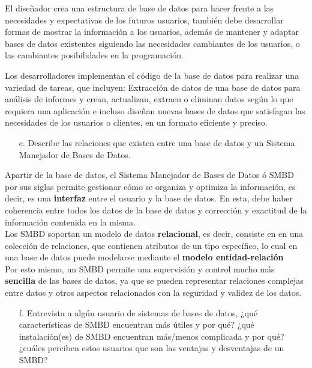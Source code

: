 \documentclass{article}
\begin{document}
\begin{enumerate}
    El diseñador crea una estructura de base de datos para hacer frente a las necesidades y expectativas de los futuros usuarios, también debe desarrollar formas de mostrar la información a los usuarios, además de mantener y adaptar bases de datos existentes siguiendo las necesidades cambiantes de los usuarios, o las cambiantes posibilidades en la programación. 

    Los desarrolladores implementan el código de la base de datos para realizar una variedad de tareas, que incluyen: Extracción de datos de una base de datos para análisis de informes y crean, actualizan, extraen o eliminan datos según lo que requiera una aplicación e incluso diseñan nuevas bases de datos que satisfagan las necesidades de los usuarios o clientes, en un formato eficiente y preciso.
    
\begin{itemize}
    \item[e.]Describe las relaciones que existen entre una base de datos y un Sistema Manejador de Bases de Datos.
    \end{itemize}
Apartir de la base de datos, el Sistema Manejador de Bases de Datos ó SMBD por sus siglas permite gestionar cómo se organiza y optimiza la información, es decir, es una \textbf{interfaz} entre el usuario y la base de datos. En esta, debe haber coherencia entre todos los datos de la base de datos y corrección y exactitud de la información contenida en la misma. \\
Los SMBD soportan un modelo de datos \textbf{relacional}, es decir, consiste en en una colección de relaciones, que contienen atributos de un tipo específico, lo cual en una base de datos puede modelarse mediante el \textbf{modelo entidad-relación}\\
Por esto mismo, un SMBD permite una supervisión y control mucho más \textbf{sencilla} de las bases de datos, ya que se pueden
 representar relaciones complejas entre datos y otros aspectos relacionados con la seguridad y validez de los datos. \\
 
\begin{itemize}
    \item[f.]Entrevista a algún usuario de sistemas de bases de datos, ¿qué características de SMBD encuentran más útiles y por qué? ¿qué instalación(es) de SMBD encuentran más/menos complicada y por qué? ¿cuáles perciben estos usuarios que son las ventajas y desventajas de un SMBD?
    \end{itemize}
    

\end{enumerate}
\end{document}
